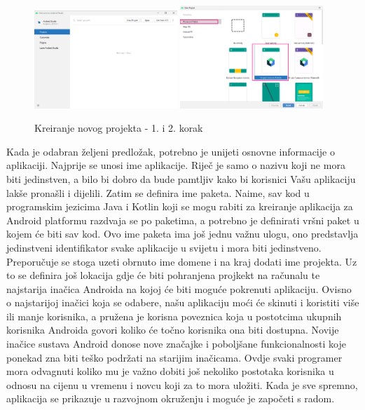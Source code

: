 \documentclass[11pt,a4paper,twoside]{article}
\begin{document}
	\begin{figure}[!h]
		\centering
		\includegraphics[width=0.48\textwidth]{new_project_01.png}
		\hfill
		\includegraphics[width=0.48\textwidth]{new_project_02.png}
		\caption{Kreiranje novog projekta - 1. i 2. korak}
		\label{fig:new_project_01}	
	\end{figure}
	
	Kada je odabran željeni predložak, potrebno je unijeti osnovne informacije o aplikaciji. Najprije se unosi ime aplikacije. Riječ je samo o nazivu koji ne mora biti jedinstven, a bilo bi dobro da bude pamtljiv kako bi korisnici Vašu aplikaciju lakše pronašli i dijelili. Zatim se definira ime paketa. Naime, sav kod u programskim jezicima Java i Kotlin koji se mogu rabiti za kreiranje aplikacija za Android platformu razdvaja se po paketima, a potrebno je definirati vršni paket u kojem će biti sav kod. Ovo ime paketa ima još jednu važnu ulogu, ono predstavlja jedinstveni identifikator svake aplikacije u svijetu i mora biti jedinstveno. Preporučuje se stoga uzeti obrnuto ime domene i na kraj dodati ime projekta. Uz to se definira još lokacija gdje će biti pohranjena projkekt na računalu te najstarija inačica Androida na kojoj će biti moguće pokrenuti aplikaciju. Ovisno o najstarijoj inačici koja se odabere, našu aplikaciju moći će skinuti i koristiti više ili manje korisnika, a pružena je korisna poveznica koja u postotcima ukupnih korisnika Androida govori koliko će točno korisnika ona biti dostupna. Novije inačice sustava Android donose nove značajke i poboljšane funkcionalnosti koje ponekad zna biti teško podržati na starijim inačicama. Ovdje svaki programer mora odvagnuti koliko mu je važno dobiti još nekoliko postotaka korisnika u odnosu na cijenu u vremenu i novcu koji za to mora uložiti. Kada je sve spremno, aplikacija se prikazuje u razvojnom okruženju i moguće je započeti s radom.
	
\end{document}
